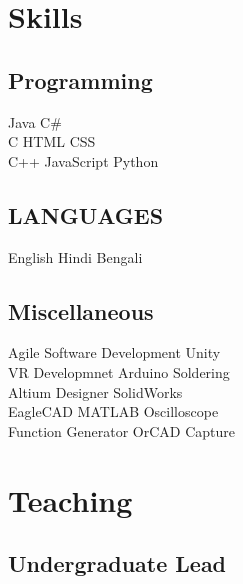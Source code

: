 \documentclass[]{deedy-resume-openfont}
\begin{document}
\begin{minipage}[t]{0.31\textwidth}



\section{Skills}
\subsection{Programming}
Java \textbullet{} C\# \\
C \textbullet{} HTML \textbullet{} CSS \\
C++ \textbullet{} JavaScript \textbullet{} Python \\
\sectionsep
\subsection{LANGUAGES}
English \textbullet{} Hindi \textbullet{} Bengali \\
\sectionsep

\subsection{Miscellaneous}
Agile Software Development \textbullet{} Unity\\
VR Developmnet \textbullet{} Arduino \textbullet{} Soldering \\
Altium Designer \textbullet{} SolidWorks\\
EagleCAD \textbullet{} MATLAB \textbullet{} Oscilloscope\\
Function Generator \textbullet{} OrCAD Capture \\
\sectionsep


\section{Teaching}
\subsection{Undergraduate Lead}

\end{minipage}
\end{document}
